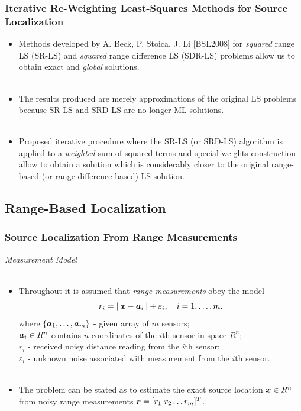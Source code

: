 \documentclass [t] {beamer} %
\begin{document}
\begin{frame} %
\frametitle{Iterative Re-Weighting Least-Squares Methods for Source
Localization}
\phantom{m}
\begin{itemize}
\item
Methods developed by A. Beck, P. Stoica, J. Li [BSL2008] for \textit{squared} range LS (SR-LS) and \textit{squared} range difference LS (SDR-LS) problems allow us to obtain exact and \textit{global}  solutions.
\\~\\
\item
The results produced are merely approximations of the original LS
problems because SR-LS and SRD-LS are no longer ML solutions.
\\~\\
\item
Proposed iterative procedure where the SR-LS (or SRD-LS) algorithm is applied to a \textit{weighted} sum of squared terms and special weights construction allow to obtain a solution which is considerably closer to
the original range-based (or range-difference-based) LS solution.
\end{itemize}
\end{frame}






\subsection{Range-Based Localization} %

\begin{frame} %
\frametitle{Source Localization From Range Measurements}
{\large \textit{Measurement Model}} \\~\\
\normalsize
\begin{itemize}
\item 
Throughout it is assumed that \textit{range measurements} obey the model
\begin{equation} 
\nonumber
r_i = \|{\mbox{\boldmath$x$}} - {\mbox{\boldmath$a$}}_i\| + \varepsilon_i, \quad i = 1, \ldots , m.
\end{equation}  
where $\{\mbox{\boldmath$a$}_1,\ldots, \mbox{\boldmath$a$}_m\}$ - given array of $m$ sensors;\\
$\mbox{\boldmath$a$}_i\in R^n$  contains $n$ coordinates of the $i$th sensor in space $R^n$; \\
$r_i$ - received noisy distance reading from the $i$th sensor; \\
$\varepsilon_i$ - unknown noise associated with measurement from the $i$th sensor. 
\\~\\
\item
The problem can be stated as to estimate the exact source location $\mbox{\boldmath$x$} \in R^n$ from noisy range measurements $\mbox{\boldmath$r$} = [r_1 \ r_2 \ldots r_m]^T$.
\end{itemize}
\end{frame}
\end{document}
